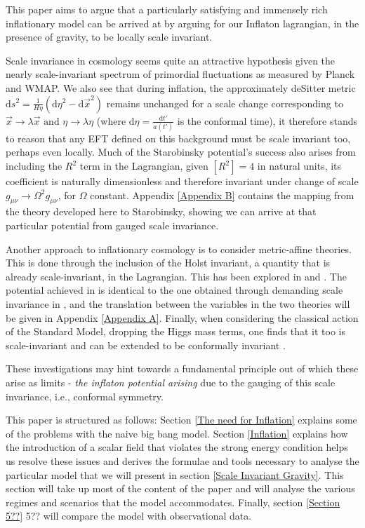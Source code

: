 \documentclass[aps,prd,reprint,preprintnumbers,showpacs,floatfix,nofootinbib,superscript address]{revtex4-2}
\begin{document}
This paper aims to argue that a particularly satisfying and immensely rich inflationary model can be arrived at by arguing for our Inflaton lagrangian, in the presence of gravity, to be locally scale invariant. 

Scale invariance in cosmology seems quite an attractive hypothesis given the nearly scale-invariant spectrum of primordial fluctuations as measured by Planck and WMAP. We also see that during inflation, the approximately deSitter metric $\text{d}s^2 = \frac{1}{H\eta}(\text{d}\eta^2 - \text{d}\Vec{x}^2)$ remains unchanged for a scale change corresponding to $\Vec{x} \rightarrow \lambda \Vec{x} \,\, \text{and} \,\, \eta \rightarrow \lambda \eta$ (where $\text{d}\eta =  \frac{\text{d}t'}{a(t')}$ is the conformal time), it therefore stands to reason that any EFT defined on this background must be scale invariant too, perhaps even locally. Much of the Starobinsky potential's success also arises from including the $R^2$ term in the Lagrangian, given $[R^2] = 4$ in natural units, its coefficient is naturally dimensionless and therefore invariant under change of scale $g_{\mu\nu} \rightarrow \Omega^2 g_{\mu\nu}$, for $\Omega$ constant. Appendix \ref{Appendix B} contains the mapping from the theory developed here to Starobinsky, showing we can arrive at that particular potential from gauged scale invariance. 

Another approach to inflationary cosmology is to consider metric-affine theories. This is done through the inclusion of the Holst invariant, a quantity that is already scale-invariant, in the Lagrangian. This has been explored in \cite{Salvio_2022} and \cite{pradisi2022equivalence}. The potential achieved in \cite{Salvio_2022} is identical to the one obtained through demanding scale invariance in \cite{barker2024poincaregaugetheoryconformal}, and the translation between the variables in the two theories will be given in Appendix \ref{Appendix A}. Finally, when considering the classical action of the Standard Model, dropping the Higgs mass terms, one finds that it too is scale-invariant and can be extended to be conformally invariant \cite{bars2014local}.

These investigations may hint towards a fundamental principle out of which these arise as limits - \textit{the inflaton potential arising} due to the gauging of this scale invariance, i.e., conformal symmetry.

This paper is structured as follows: Section \ref{The need for Inflation} explains some of the problems with the naive big bang model. Section \ref{Inflation} explains how the introduction of a scalar field that violates the strong energy condition helps us resolve these issues and derives the formulae and tools necessary to analyse the particular model that we will present in section \ref{Scale Invariant Gravity}. This section will take up most of the content of the paper and will analyse the various regimes and scenarios that the model accommodates. Finally, section \ref{Section 5??} 5?? will compare the model with observational data.
\end{document}
